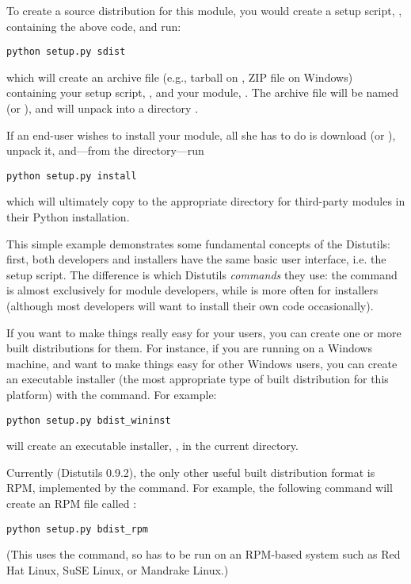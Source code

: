 \documentclass{howto}
\begin{document}
To create a source distribution for this module, you would create a
setup script, , containing the above code, and run:
\begin{verbatim}
python setup.py sdist
\end{verbatim}
which will create an archive file (e.g., tarball on \UNIX, ZIP file on
Windows) containing your setup script, , and your module,
.  The archive file will be named  (or
), and will unpack into a directory .

If an end-user wishes to install your  module, all she has
to do is download  (or ), unpack it,
and---from the  directory---run
\begin{verbatim}
python setup.py install
\end{verbatim}
which will ultimately copy  to the appropriate directory
for third-party modules in their Python installation.

This simple example demonstrates some fundamental concepts of the
Distutils: first, both developers and installers have the same basic
user interface, i.e. the setup script.  The difference is which
Distutils \emph{commands} they use: the  command is
almost exclusively for module developers, while  is
more often for installers (although most developers will want to install
their own code occasionally).

If you want to make things really easy for your users, you can create
one or more built distributions for them.  For instance, if you are
running on a Windows machine, and want to make things easy for other
Windows users, you can create an executable installer (the most
appropriate type of built distribution for this platform) with the
 command.  For example:
\begin{verbatim}
python setup.py bdist_wininst
\end{verbatim}
will create an executable installer, , in the
current directory.

Currently (Distutils 0.9.2), the only other useful built
distribution format is RPM, implemented by the 
command.  For example, the following command will create an RPM file
called :
\begin{verbatim}
python setup.py bdist_rpm
\end{verbatim}
(This uses the  command, so has to be run on an RPM-based
system such as Red Hat Linux, SuSE Linux, or Mandrake Linux.)
\end{document}
